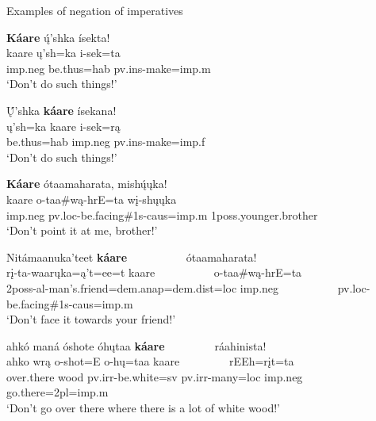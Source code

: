 \begin{exe}
    \item\label{Ch5ExImperativeNegatives} Examples of negation of imperatives

    \begin{xlist}

    \item\label{Ch5ExImperativeNegativesA} \glll \textbf{Káare} ų́'shka ísekta!\\
    kaare ų'sh=ka i-sek=ta\\
    imp.neg \textnormal{be.thus}=hab pv.ins-\textnormal{make}=imp.m\\
    \glt `Don't do such things!' \citep[157]{trechter2012b}

    \item\label{Ch5ExImperativeNegativesB} \glll Ų́'shka \textbf{káare} ísekana!\\
    ų'sh=ka kaare i-sek=rą\\
    \textnormal{be.thus}=hab imp.neg pv.ins-\textnormal{make}=imp.f\\
    \glt `Don't do such things!' \citep[158]{trechter2012b}

    \item\label{Ch5ExImperativeNegativesC} \glll \textbf{Káare} ótaamaharata, mishų́ųka!\\
    kaare o-taa\#wą-hrE=ta wį-shųųka\\
    imp.neg pv.loc-\textnormal{be.facing}\#1s-caus=imp.m 1poss.\textnormal{younger.brother}\\
    \glt `Don't point it at me, brother!' \citep[167]{hollow1973a}

     \item\label{Ch5ExImperativeNegativesD} \glll Nitámaanuka'teet \textbf{káare} ~ ~ ~ ~ ~ ~ ótaamaharata!\\
    rį-ta-waarųka=ą't=ee=t kaare ~ ~ ~ ~ ~ ~ o-taa\#wą-hrE=ta\\
    2poss-al-\textnormal{man's.friend}=dem.anap=dem.dist=loc imp.neg ~ ~ ~ ~ ~ ~ pv.loc-\textnormal{be.facing}\#1s-caus=imp.m\\
    \glt `Don't face it towards your friend!' \citep[167]{hollow1973a}

    \item\label{Ch5ExImperativeNegativesE} \glll ahkó maná óshote óhųtaa \textbf{káare} ~ ~ ~ ~ ~  ráahinista!\\
    ahko wrą o-shot=E o-hų=taa kaare ~ ~ ~ ~ ~  rEEh=rįt=ta\\
    \textnormal{over.there} \textnormal{wood} pv.irr-\textnormal{be.white}=sv pv.irr-\textnormal{many}=loc imp.neg ~ ~ ~ ~ ~  \textnormal{go.there}=2pl=imp.m\\
    \glt `Don't go over there where there is a lot of white wood!' \citep[168]{hollow1973a}


\end{xlist}
\end{exe}
